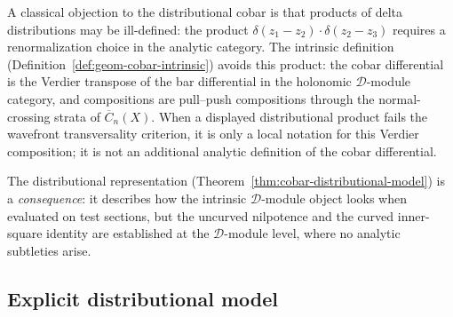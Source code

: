 \begin{remark}\label{rem:delta-product-resolution}
A classical objection to the distributional cobar is that products of delta
distributions may be ill-defined: the product
$\delta(z_1 - z_2) \cdot \delta(z_2 - z_3)$ requires a renormalization
choice in the analytic category. The intrinsic
definition (Definition~\ref{def:geom-cobar-intrinsic}) avoids this
product: the cobar differential is the Verdier transpose of the bar
differential in the holonomic $\mathcal{D}$-module category, and
compositions are pull--push compositions through the normal-crossing
strata of $\overline{C}_n(X)$. When a displayed distributional product
fails the wavefront transversality criterion, it is only a local
notation for this Verdier composition; it is not an additional analytic
definition of the cobar differential.

The distributional representation
(Theorem~\ref{thm:cobar-distributional-model}) is a \emph{consequence}: it
describes how the intrinsic $\mathcal{D}$-module object looks when evaluated
on test sections, but the uncurved nilpotence and the curved inner-square
identity are established at the $\mathcal{D}$-module level, where no
analytic subtleties arise.
\end{remark}


\subsection{Explicit distributional model}\label{subsec:distributional-model}

